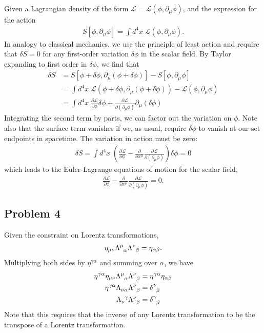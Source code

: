 \documentclass{mathnotes}
\begin{document}
Given a Lagrangian density of the form $\mathcal{L}=\mathcal{L}(\phi,\partial_\mu\phi)$, and the expression for the action
\begin{align*}
    S[\phi, \partial_\mu\phi]=\int d^4x\; \mathcal{L}(\phi,\partial_\mu\phi).
\end{align*}
In analogy to classical mechanics, we use the principle of least action and require that $\delta S=0$ for any first-order variation $\delta \phi$ in the scalar field. 
By Taylor expanding to first order in $\delta\phi$, we find that
\begin{align*}
    \delta S&=S[\phi+\delta\phi,\partial_\mu(\phi+\delta\phi)]-S[\phi,\partial_\mu\phi]\\
    &=\int d^4x\; \mathcal{L}(\phi+\delta\phi,\partial_\mu(\phi+\delta\phi)) - \mathcal{L}(\phi,\partial_\mu\phi)\\
    &=\int d^4x\; \frac{\partial\mathcal{L}}{\partial\phi}\delta\phi + \frac{\partial\mathcal{L}}{\partial(\partial_\mu\phi)}\partial_\mu(\delta\phi) 
\end{align*}
Integrating the second term by parts, we can factor out the variation on $\phi$. Note also that the surface term vanishes if we, as usual, require $\delta\phi$ to vanish
at our set endpoints in spacetime. The variation in action must be zero:
\begin{align*}
    \delta S=\int d^4x\;\left( \frac{\partial \mathcal{L}}{\partial\phi}-\frac{\partial}{\partial x^\mu}\frac{\partial\mathcal{L}}{\partial(\partial_\mu\phi)} \right)\delta\phi=0
\end{align*}
which leads to the Euler-Lagrange equations of motion for the scalar field,
\begin{align*}
    \frac{\partial \mathcal{L}}{\partial\phi}-\frac{\partial}{\partial x^\mu}\frac{\partial\mathcal{L}}{\partial(\partial_\mu\phi)}=0.
\end{align*}

\subsection*{Problem 4}

Given the constraint on Lorentz transformations,
\begin{align*}
    \eta_{\mu\nu}\tensor{\Lambda}{^\mu_\alpha}\tensor{\Lambda}{^\nu_\beta}=\eta_{\alpha\beta}.
\end{align*}
Multiplying both sides by $\eta^{\gamma\alpha}$ and summing over $\alpha$, we have 
\begin{align*}
    \eta^{\gamma\alpha}\eta_{\mu\nu}\tensor{\Lambda}{^\mu_\alpha}\tensor{\Lambda}{^\nu_\beta}&=\eta^{\gamma\alpha}\eta_{\alpha\beta}\\
    \eta^{\gamma\alpha}\tensor{\Lambda}{_\nu_\alpha}\tensor{\Lambda}{^\nu_\beta}&=\tensor{\delta}{^\gamma_\beta}\\
    \tensor{\Lambda}{_\nu^\gamma}\tensor{\Lambda}{^\nu_\beta}&=\tensor{\delta}{^\gamma_\beta}
\end{align*}
Note that this requires that the inverse of any Lorentz transformation to be the transpose of a Lorentz transformation.
\end{document}
